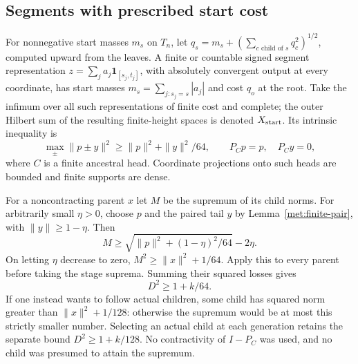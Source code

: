 \subsection{Segments with prescribed start cost}\label{met:segment-section}
For nonnegative start masses $m_s$ on $T_n$, let
$q_s=m_s+(\sum_{c\text{ child of }s}q_c^2)^{1/2}$, computed upward
from the leaves. A finite or countable signed segment representation
$z=\sum_j a_j\mathbf1_{[s_j,t_j]}$, with absolutely convergent output
at every coordinate, has start masses
$m_s=\sum_{j:s_j=s}|a_j|$ and cost $q_o$ at the root. Take the
infimum over all such representations of finite cost and complete; the outer Hilbert sum
of the resulting finite-height spaces is denoted $X_{\rm start}$.
Its intrinsic inequality is \cite[Theorem~8.4]{TreePotentials}
\begin{equation}\label{met:segment-input}
 \max_\pm\|p\pm y\|^2\ge\|p\|^2+\|y\|^2/64,
 \qquad P_Cp=p,\quad P_Cy=0,
\end{equation}
where $C$ is a finite ancestral head. Coordinate projections onto such
heads are bounded and finite supports are dense.

For a noncontracting parent $x$ let $M$ be the supremum of its child
norms. For arbitrarily small $\eta>0$, choose $p$ and the paired tail
$y$ by Lemma~\ref{met:finite-pair}, with $\|y\|\ge1-\eta$.
Then
\[
 M\ge\sqrt{\|p\|^2+(1-\eta)^2/64}-2\eta.
\]
On letting $\eta$ decrease to zero, $M^2\ge\|x\|^2+1/64$.
Apply this to every parent before taking the stage suprema. Summing
their squared losses gives
\begin{equation}\label{met:segment-graph}
 D^2\ge1+k/64.
\end{equation}
If one instead wants to follow actual children, some child has squared
norm greater than
$\|x\|^2+1/128$: otherwise the supremum would be at most this
strictly smaller number. Selecting an actual child at each generation
retains the separate bound $D^2\ge1+k/128$.
No contractivity of $I-P_C$ was used, and no child was presumed to
attain the supremum.

